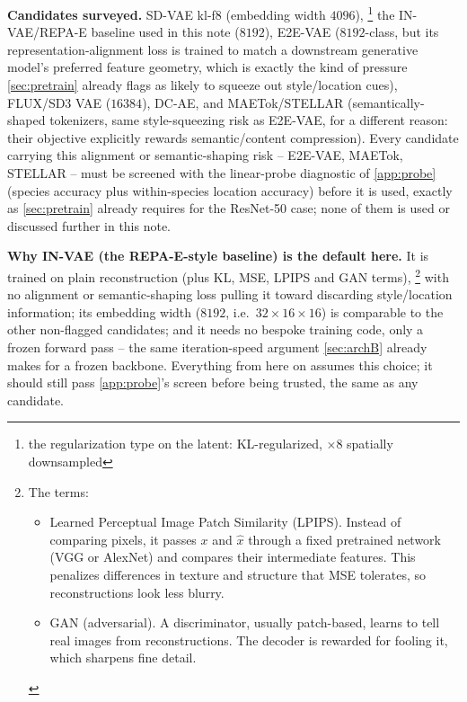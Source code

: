 \textbf{Candidates surveyed.} SD-VAE kl-f8 (embedding width $4096$),
\footnote{the regularization type on the latent: KL-regularized, $\times$8 spatially downsampled}
the IN-VAE/REPA-E baseline used in
this note ($8192$), E2E-VAE ($8192$-class, but its representation-alignment loss is trained to match a
downstream generative model's preferred feature geometry, which is exactly the kind of pressure
\cref{sec:pretrain} already flags as likely to squeeze out style/location cues), FLUX/SD3 VAE
($16384$), DC-AE, and MAETok/STELLAR (semantically-shaped tokenizers, same style-squeezing risk as
E2E-VAE, for a different reason: their objective explicitly rewards semantic/content compression). Every
candidate carrying this alignment or semantic-shaping risk -- E2E-VAE, MAETok, STELLAR -- must be screened
with the linear-probe diagnostic of \cref{app:probe} (species accuracy plus within-species location
accuracy) before it is used, exactly as \cref{sec:pretrain} already requires for the ResNet-50 case; none
of them is used or discussed further in this note.

\textbf{Why IN-VAE (the REPA-E-style baseline) \cite{leng2025repae} is the default here.} It is 
trained on plain reconstruction (plus KL, MSE, LPIPS and GAN terms),
\footnote{The terms:
\begin{itemize}[topsep=0pt]
\item Learned Perceptual Image Patch Similarity (LPIPS). Instead of comparing pixels, it passes $x$ 
   and $\hat x$ through a fixed pretrained network (VGG or AlexNet) and compares their intermediate 
   features. This penalizes differences in texture and structure that MSE tolerates, so 
   reconstructions look less blurry.
\item GAN (adversarial). A discriminator, usually patch-based, learns to tell real images from 
   reconstructions. The decoder is rewarded for fooling it, which sharpens fine detail.
\end{itemize}
}
with no alignment or semantic-shaping loss pulling it toward
discarding style/location information; its embedding width ($8192$, i.e.\ $32\times16\times16$) is
comparable to the other non-flagged candidates; and it needs no bespoke training code, only a frozen
forward pass -- the same iteration-speed argument \cref{sec:archB} already makes for a frozen backbone.
Everything from here on assumes this choice; it should still pass \cref{app:probe}'s screen before being
trusted, the same as any candidate.

